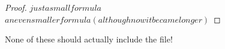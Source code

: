 \documentclass[11pt]{article}
\begin{document}
\begin{theorem}
\end{theorem}

\begin{proof}
$just a small formula$
$an even smaller formula (although now it became longer)$
\end{proof}

\begin{lemma}
\end{lemma}

None of these should actually include the file!
\end{document}

